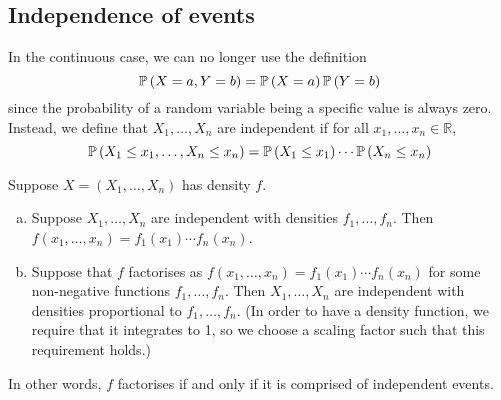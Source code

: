 \subsection{Independence of events}
In the continuous case, we can no longer use the definition
\[\mathbb{P}\left({X = a, Y = b}\right) = \mathbb{P}\left({X = a}\right)\mathbb{P}\left({Y = b}\right)\]
since the probability of a random variable being a specific value is always zero.
Instead, we define that \(X_1, \dots, X_n\) are independent if for all \(x_1, \dots, x_n \in \mathbb R\),
\[
	\mathbb{P}\left({X_1 \leq x_1, \dots, X_n \leq x_n}\right) = \mathbb{P}\left({X_1 \leq x_1}\right)\cdots\mathbb{P}\left({X_n \leq x_n}\right)
\]
\begin{theorem}
	Suppose \(X = (X_1, \dots, X_n)\) has density \(f\).
	\begin{enumerate}[(a)]
		\item Suppose \(X_1, \dots, X_n\) are independent with densities \(f_1, \dots, f_n\).
		      Then \(f(x_1, \dots, x_n) = f_1(x_1)\cdots f_n(x_n)\).
		\item Suppose that \(f\) factorises as \(f(x_1, \dots, x_n) = f_1(x_1)\cdots f_n(x_n)\) for some non-negative functions \(f_1, \dots, f_n\).
		      Then \(X_1, \dots, X_n\) are independent with densities proportional to \(f_1, \dots, f_n\).
		      (In order to have a density function, we require that it integrates to 1, so we choose a scaling factor such that this requirement holds.)
	\end{enumerate}
	In other words, \(f\) factorises if and only if it is comprised of independent events.
\end{theorem}
